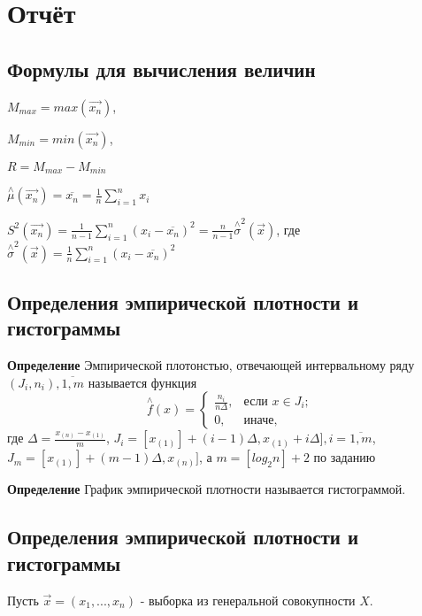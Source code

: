 \chapter*{Отчёт}
\section*{Формулы для вычисления величин}

$M_{max}=max(\overrightarrow{x_n})$,
 
$M_{min}=min(\overrightarrow{x_n})$,
 
$R=M_{max}-M_{min}$
 
$\stackrel{\wedge}{\mu}(\overrightarrow{x_n}) = \overline{x_n} = \frac{1}{n} \sum\limits_{i=1}^n x_i$

$S^2(\overrightarrow{x_n})=\frac{1}{n-1} \sum\limits_{i=1}^n (x_i-\overline{x_n})^2 = \frac{n}{n-1} \stackrel{\wedge}{\sigma}^2(\overrightarrow{x})$, где $\stackrel{\wedge}{\sigma}^2(\overrightarrow{x}) = \frac{1}{n} \sum\limits_{i=1}^n (x_i-\overline{x_n})^2$

\section*{Определения эмпирической плотности и гистограммы}
\textbf{Определение} Эмпирической плотонстью, отвечающей интервальному ряду $(J_i, n_i), \overline{1,m}$ называется функция
\begin{equation*}
	\stackrel{\wedge}{f}(x) =
	\begin{cases}
		\frac{n_i}{n\Delta}, &\text{если $x\in J_i$;}\\
		0, &\text{иначе,}
	\end{cases}
\end{equation*}
где  $\Delta = \frac{x_{(n)}-x_{(1)}}{m}$,\newline
$J_i=[x_{(1)}]+(i-1)\Delta, x_{(1)}+i\Delta], i=\overline{1,m}$,\newline
$J_m=[x_{(1)}]+(m-1)\Delta, x_{(n)}]$,\newline
а $m=[log_2 n]+2$ по заданию

\textbf{Определение} График эмпирической плотности называется гистограммой.

\newpage
\section*{Определения эмпирической плотности и гистограммы}
Пусть $\overrightarrow{x}=(x_1, ..., x_n)$ - выборка из генеральной совокупности $X$.

